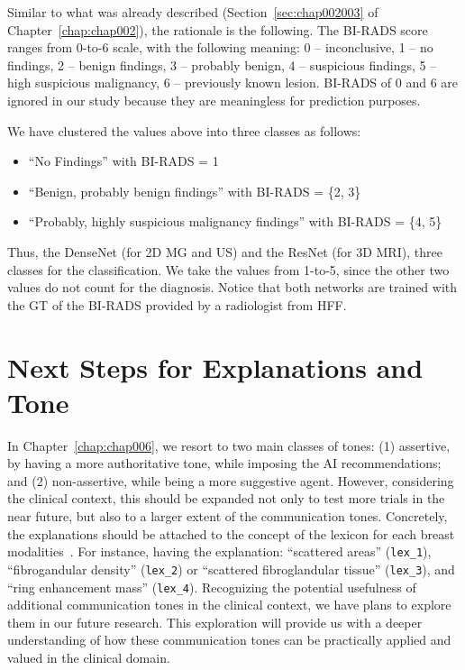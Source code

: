 Similar to what was already described (Section~\ref{sec:chap002003} of Chapter~\ref{chap:chap002}), the rationale is the following.
The \ac{BI-RADS} score ranges from 0-to-6 scale, with the following meaning:
0 -- inconclusive,
1 -- no findings,
2 -- benign findings,
3 -- probably benign,
4 -- suspicious findings,
5 -- high suspicious malignancy,
6 -- previously known lesion.
\ac{BI-RADS} of 0 and 6 are ignored in our study because they are meaningless for prediction purposes.

\vspace{1.00mm}

\noindent
We have clustered the values above into three classes as follows:

\vspace{0.05mm}

\begin{itemize}
\item ``No Findings'' with \ac{BI-RADS} = 1
\item ``Benign, probably benign findings'' with \ac{BI-RADS} = \{2, 3\}
\item ``Probably, highly suspicious malignancy findings'' with \ac{BI-RADS} = \{4, 5\}
\end{itemize}

Thus, the  DenseNet (for 2D \ac{MG} and \ac{US}) and the ResNet (for 3D \ac{MRI}), three classes for the classification.
We take the values from 1-to-5, since the other two values do not count for the diagnosis.
Notice that both networks are trained with the \ac{GT} of the \ac{BI-RADS} provided by a radiologist from \ac{HFF}.

\section{Next Steps for Explanations and Tone}
\label{sec:app005015}

In Chapter~\ref{chap:chap006}, we resort to two main classes of tones:
(1) assertive, by having a more authoritative tone, while imposing the \ac{AI} recommendations; and
(2) non-assertive, while being a more suggestive agent.
However, considering the clinical context, this should be expanded not only to test more trials in the near future, but also to a larger extent of the communication tones.
Concretely, the explanations should be attached to the concept of the lexicon for each breast modalities~\cite{SPAK2017179}.
For instance, having the explanation: ``scattered areas'' (\texttt{lex\_1}), ``fibrogandular density'' (\texttt{lex\_2})  or ``scattered fibroglandular tissue'' (\texttt{lex\_3}), and ``ring enhancement mass'' (\texttt{lex\_4}).
Recognizing the potential usefulness of additional communication tones in the clinical context, we have plans to explore them in our future research.
This exploration will provide us with a deeper understanding of how these communication tones can be practically applied and valued in the clinical domain.

